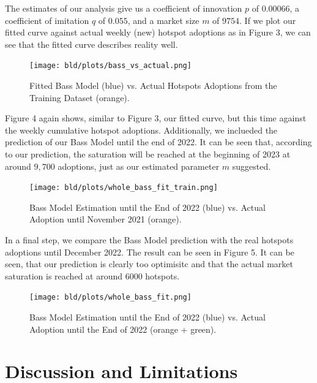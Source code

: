 \documentclass{article}
\begin{document}
\bigskip

\noindent The estimates of our analysis give us a coefficient of innovation $p$ of $0.00066$, a coefficient of imitation $q$ of $0.055$, and a market size $m$ of $9754$. If we
plot our fitted curve against actual weekly (new) hotspot adoptions as in Figure 3, we can see that the fitted curve describes reality well.

\begin{figure}[!hptb]
    \centering{}\texttt{[image: bld/plots/bass\_vs\_actual.png]}\\
    \caption{Fitted Bass Model (blue) vs. Actual Hotspots Adoptions from the Training Dataset (orange).}
\end{figure}

\noindent Figure 4 again shows, similar to Figure 3, our fitted curve, but this time against the weekly cumulative hotspot adoptions. Additionally, we inclueded the prediction
of our Bass Model until the end of 2022. It can be seen that, according to our prediction, the saturation will be reached at the beginning of 2023 at around $9,700$ adoptions,
just as our estimated parameter $m$ suggested.


\begin{figure}[!hptb]
    \centering{}\texttt{[image: bld/plots/whole\_bass\_fit\_train.png]}\\
    \caption{Bass Model Estimation until the End of 2022 (blue) vs. Actual Adoption until November 2021 (orange).}
\end{figure}

\noindent In a final step, we compare the Bass Model prediction with the real hotspots adoptions until December 2022. The result can be seen in Figure 5. It can be seen, that our
prediction is clearly too optimisitc and that the actual market saturation is reached at around $6000$ hotspots.

\begin{figure}[!hptb]
    \centering{}\texttt{[image: bld/plots/whole\_bass\_fit.png]}\\
    \caption{Bass Model Estimation until the End of 2022 (blue) vs. Actual Adoption until the End of 2022 (orange + green).}
\end{figure}


\section{Discussion and Limitations}
\end{document}
